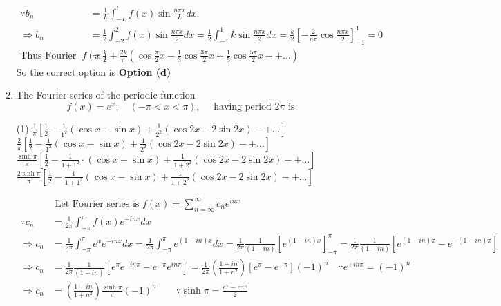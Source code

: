 \begin{enumerate}
\begin{answer}
\begin{align*}
	\because b_{n}&=\frac{1}{L} \int_{-L}^{l} f(x) \sin \frac{n \pi x}{L} d x\\
	\Rightarrow b_{n}&=\frac{1}{2} \int_{-2}^{2} f(x) \sin \frac{n \pi x}{2} d x=\frac{1}{2} \int_{-1}^{1} k \sin \frac{n \pi x}{2} d x=\frac{k}{2}\left[-\frac{2}{n \pi} \cos \frac{n \pi x}{2}\right]_{-1}^{1}=0\\
	\text{Thus Fourier series is }f(x)&=\frac{k}{2}+\frac{2 k}{\pi}\left(\cos \frac{\pi}{2} x-\frac{1}{3} \cos \frac{3 \pi}{2} x+\frac{1}{5} \cos \frac{5 \pi}{2} x-+\ldots\right)
	\end{align*}
	So the correct option is \textbf{Option (d)}
\end{answer}
	\item The Fourier series of the periodic function
	$$
	f(x)=e^{x} ; \quad(-\pi<x<\pi), \quad \text { having period } 2 \pi \text { is }
	$$
	 \begin{tasks}(1)
		\task[\textbf{a.}]$\frac{1}{\pi}\left[\frac{1}{2}-\frac{1}{1^{2}}(\cos x-\sin x)+\frac{1}{2^{2}}(\cos 2 x-2 \sin 2 x)-+\ldots\right]$
		\task[\textbf{b.}]$\frac{2}{\pi}\left[\frac{1}{2}-\frac{1}{1^{2}}(\cos x-\sin x)+\frac{1}{2^{2}}(\cos 2 x-2 \sin 2 x)-+\ldots\right]$
		\task[\textbf{c.}] $\frac{\sinh \pi}{\pi}\left[\frac{1}{2}-\frac{1}{1+1^{2}} \cdot(\cos x-\sin x)+\frac{1}{1+2^{2}}(\cos 2 x-2 \sin 2 x)-+\ldots\right]$
		\task[\textbf{d.}] $\frac{2 \sinh \pi}{\pi}\left[\frac{1}{2}-\frac{1}{1+1^{2}}(\cos x-\sin x)+\frac{1}{1+2^{2}}(\cos 2 x-2 \sin 2 x)-+\ldots\right]$
	\end{tasks}
\begin{answer}
	\begin{align*}
&\text{	Let Fourier series is }f(x)=\sum_{n=\infty}^{\infty} c_{n} e^{i n x}\\
\because c_{n}&=\frac{1}{2 \pi} \int_{-\pi}^{\pi} f(x) e^{-i n x} d x\\
\Rightarrow c_{n}&=\frac{1}{2 \pi} \int_{-\pi}^{\pi} e^{x} e^{-i n x} d x=\frac{1}{2 \pi} \int_{-\pi}^{\pi} e^{(1-i n) x} d x=\frac{1}{2 \pi} \frac{1}{(1-i n)}\left[e^{(1-i n) x}\right]_{-\pi}^{\pi}=\frac{1}{2 \pi} \frac{1}{(1-i n)}\left[e^{(1-i n) \pi}-e^{-(1-i n) \pi}\right]\\
\Rightarrow c_{n}&=\frac{1}{2 \pi} \frac{1}{(1-i n)}\left[e^{\pi} e^{-i n \pi}-e^{-\pi} e^{i n \pi}\right]=\frac{1}{2 \pi}\left(\frac{1+i n}{1+n^{2}}\right)\left[e^{\pi}-e^{-\pi}\right](-1)^{n} \quad \because e^{\pm i n \pi}=(-1)^{n}\\
\Rightarrow c_{n}&=\left(\frac{1+i n}{1+n^{2}}\right) \frac{\sinh \pi}{\pi}(-1)^{n} \quad \quad \because \sinh \pi=\frac{e^{\pi}-e^{-\pi}}{2}

\end{align*}
\end{answer}
\end{enumerate}
